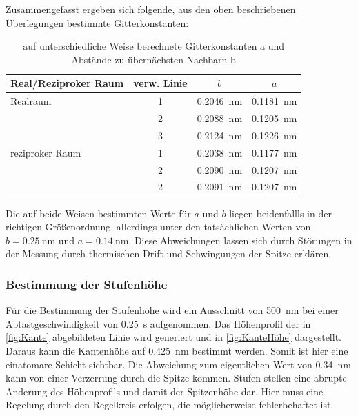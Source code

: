 \documentclass[a4paper,twoside,final]{article}
\begin{document}
\FloatBarrier
Zusammengefasst ergeben sich folgende, aus den oben beschriebenen Überlegungen bestimmte Gitterkonstanten:

\begin{table}[htp]
	\centering
	\caption{auf unterschiedliche Weise berechnete Gitterkonstanten a und Abstände zu übernächsten Nachbarn b}
	\label{tab:Gitterkonstante}
  \begin{tabular}{l c c c}
   \toprule
   Real/Reziproker Raum & verw. Linie & $b$  & $a$  \\
   \midrule
   Realraum    & 1  & \SI{0,2046}{\nano\meter}  & \SI{0,1181}{\nano\meter}\\
     & 2 & \SI{0,2088}{\nano\meter}         & \SI{0,1205}{\nano\meter}\\
   & 3 & \SI{0,2124}{\nano\meter}         & \SI{0,1226}{\nano\meter}\\
  reziproker Raum  & 1 & \SI{0,2038}{\nano\meter}         & \SI{0,1177}{\nano\meter}\\
   & 2 & \SI{0,2090}{\nano\meter}         & \SI{0,1207}{\nano\meter}\\
    & 2 & \SI{0,2091}{\nano\meter}         & \SI{0,1207}{\nano\meter}\\
   \bottomrule
  \end{tabular}
\end{table}
Die auf beide Weisen bestimmten Werte für $a$ und $b$ liegen beidenfallls in der richtigen Größenordnung, allerdings unter den tatsächlichen Werten von $b = \SI{0,25}{\nano\meter}$ und $a = \SI{0,14}{\nano\meter}$. Diese Abweichungen lassen sich durch Störungen in der Messung durch thermischen Drift und Schwingungen der Spitze erklären.

\FloatBarrier
\subsubsection{Bestimmung der Stufenhöhe}
Für die Bestimmung der Stufenhöhe wird ein Ausschnitt von \SI{500}{\nano\meter} bei einer Abtastgeschwindigkeit von \SI{0,25}{\second} aufgenommen. Das Höhenprofil der in \ref{fig:Kante} abgebildeten Linie wird generiert und in \ref{fig:KanteHöhe} dargestellt. Daraus kann die Kantenhöhe auf \SI{0,425}{\nano\meter} bestimmt werden. Somit ist hier eine einatomare Schicht sichtbar. Die Abweichung zum eigentlichen Wert von \SI{0,34}{\nano\meter} kann von einer Verzerrung durch die Spitze kommen. Stufen stellen eine abrupte Änderung des Höhenprofils und damit der Spitzenhöhe dar. Hier muss eine Regelung durch den Regelkreis erfolgen, die möglicherweise fehlerbehaftet ist.
\end{document}
